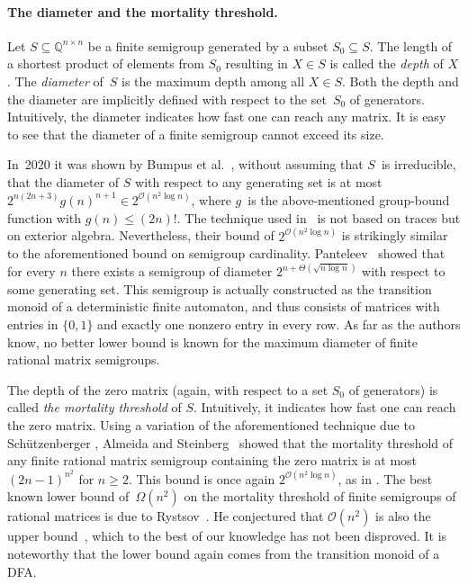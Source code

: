 \documentclass{lmcs}
\theoremstyle{definition}
\newcommand{\OO}{\mathcal{O}}
\newcommand{\Q}{\mathbb{Q}}
\begin{document}
\paragraph*{The diameter and the mortality threshold.}

Let $S \subseteq \Q^{n \times n}$ be a finite semigroup generated by a subset $S_0 \subseteq S$. The length of a shortest product of elements from $S_0$ resulting in $X \in S$ is called the \emph{depth} of $X$. The \emph{diameter} of~$S$ is the maximum depth among all $X \in S$. Both the depth and the diameter are implicitly defined with respect to the set~$S_0$ of generators. Intuitively, the diameter indicates how fast one can reach any matrix. It is easy to see that the diameter of a finite semigroup cannot exceed its size.

In~2020 it was shown by Bumpus et al.~\cite{BumpusHKST20}, without assuming that $S$~is irreducible, that the diameter of $S$ with respect to any generating set is at most $2^{n (2 n + 3)} g(n)^{n+1} \in 2^{\OO(n^2 \log n)}$, where $g$~is the above-mentioned group-bound function with $g(n) \le (2 n)!$.
The technique used in~\cite{BumpusHKST20} is not based on traces but on exterior algebra. 
Nevertheless, their bound of $2^{\OO(n^2 \log n)}$ is strikingly similar to the aforementioned bound on semigroup cardinality. Panteleev~\cite{Panteleev15} showed that for every $n$ there exists a semigroup of diameter $2^{n + \Theta(\sqrt{n \log n})}$ with respect to some generating set. This semigroup is actually constructed as the transition monoid of a deterministic finite automaton, and thus consists of matrices with entries in $\{0, 1\}$ and exactly one nonzero entry in every row. As far as the authors know, no better lower bound is known for the maximum diameter of finite rational matrix semigroups.

The depth of the zero matrix (again, with respect to a set $S_0$ of generators) is called \emph{the mortality threshold} of $S$.
Intuitively, it indicates how fast one can reach the zero matrix.
Using a variation of the aforementioned technique due to Sch{\"{u}}tzenberger \cite{Schutzenberger62,Berstel2011}, Almeida and Steinberg~\cite{AlmeidaSteinberg09} showed that the mortality threshold of any finite rational matrix semigroup containing the zero matrix is at most $(2 n - 1)^{n^2}$ for $n \ge 2$.
This bound is once again $2^{\OO(n^2 \log n)}$, as in \cite{Schutzenberger62,Berstel2011,BumpusHKST20}.
The best known lower bound of~$\Omega(n^2)$ 
on the mortality threshold of finite semigroups of rational matrices is due to Rystsov~\cite{Rystsov1997}.
He conjectured that $\OO(n^2)$ is also the upper bound~\cite{Rystsov1992Rank}, which to the best of our knowledge has not been disproved. It is noteworthy that the lower bound again comes from the transition monoid of a DFA. 
\end{document}
